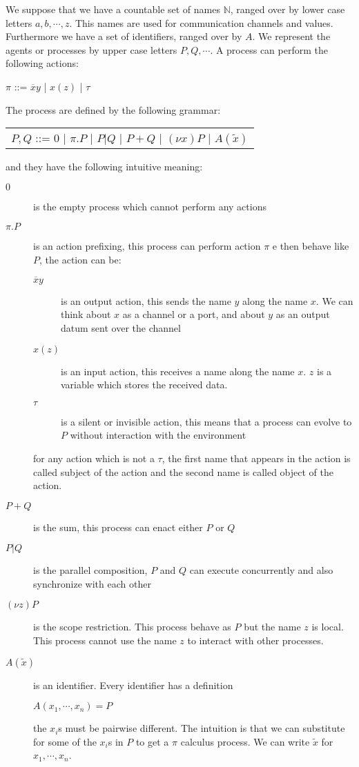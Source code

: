 We suppose that we have a countable set of names $\mathbb{N}$, ranged over by lower case letters $a,b, \cdots, z$. This names are used for communication channels and values. Furthermore we have a set of identifiers, ranged over by $A$. We represent the agents or processes by upper case letters $P,Q, \cdots $. A process can perform the following actions:
\begin{center}
  $\pi$ ::= $\overline{x}y$ | $x(z)$ | $\tau$ 
\end{center}
The process are defined by the following grammar:
\begin{center}
  \begin{tabular}{l}
    $P,Q$ ::= $0$ | $\pi.P$ | $P|Q$ | $P+Q$ | $(\nu x) P$ | $A(\tilde{x})$ 
  \end{tabular}
\end{center}
and they have the following intuitive meaning:
\begin{description}
  \item[$0$] 
    is the empty process which cannot perform any actions
  \item[$\pi.P$] 
    is an action prefixing, this process can perform action $\pi$ e then behave like $P$, the action can be:
    \begin{description}
      \item[$\overline{x}y$] 
	is an output action, this sends the name $y$ along the name $x$. We can think about $x$ as a channel or a port, and about $y$ as an output datum sent over the channel
      \item[$x(z)$] 
	is an input action, this receives a name along the name $x$. $z$ is a variable which stores the received data.
      \item[$\tau$] 
	is a silent or invisible action, this means that a process can evolve to $P$ without interaction with the environment 
    \end{description}
    for any action which is not a $\tau$, the first name that appears in the action is called subject of the action and the second name is called object of the action.
  \item[$P+Q$] 
    is the sum, this process can enact either $P$ or $Q$
  \item[$P|Q$] 
    is the parallel composition, $P$ and $Q$ can execute concurrently and also synchronize with each other
  \item[$(\nu z) P$] 
    is the scope restriction. This process behave as $P$ but the name $z$ is local. This process cannot use the name $z$ to interact with other processes.
  \item[$A(\tilde{x})$] 
    is an identifier. Every identifier has a definition
    \begin{center}
      $A(x_{1}, \cdots, x_{n})=P$
    \end{center}
    the $x_{i}$s must be pairwise different. The intuition is that we can substitute for some of the $x_{i}$s in $P$ to get a $\pi$ calculus process. We can write $\tilde{x}$ for $x_{1}, \cdots, x_{n}$.
\end{description}

